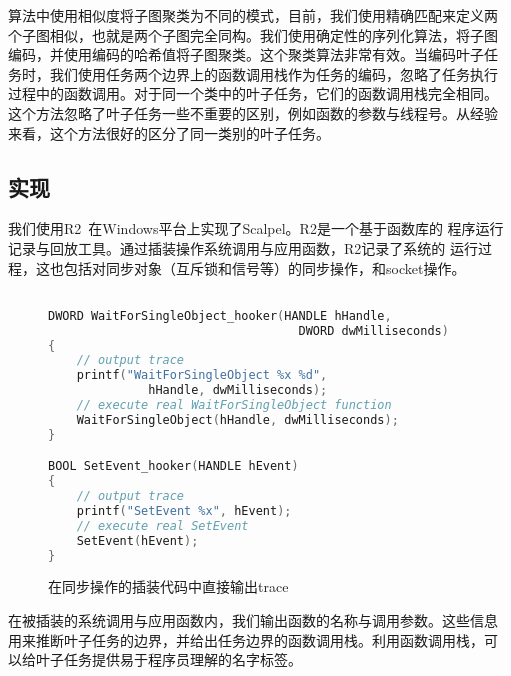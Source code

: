 算法中使用相似度将子图聚类为不同的模式，目前，我们使用精确匹配来定义两
个子图相似，也就是两个子图完全同构。我们使用确定性的序列化算法，将子图
编码，并使用编码的哈希值将子图聚类。这个聚类算法非常有效。当编码叶子任
务时，我们使用任务两个边界上的函数调用栈作为任务的编码，忽略了任务执行
过程中的函数调用。对于同一个类中的叶子任务，它们的函数调用栈完全相同。
这个方法忽略了叶子任务一些不重要的区别，例如函数的参数与线程号。从经验
来看，这个方法很好的区分了同一类别的叶子任务。



\subsection{实现}

我们使用R2~\cite{r2}在Windows平台上实现了Scalpel。R2是一个基于函数库的
程序运行记录与回放工具。通过插装操作系统调用与应用函数，R2记录了系统的
运行过程，这也包括对同步对象（互斥锁和信号等）的同步操作，和socket操作。

\begin{figure}
\centering
\begin{lstlisting}[language=C++]

DWORD WaitForSingleObject_hooker(HANDLE hHandle,
                                   DWORD dwMilliseconds)
{
    // output trace
    printf("WaitForSingleObject %x %d",
              hHandle, dwMilliseconds);
    // execute real WaitForSingleObject function
    WaitForSingleObject(hHandle, dwMilliseconds);
}

BOOL SetEvent_hooker(HANDLE hEvent)
{
    // output trace
    printf("SetEvent %x", hEvent);
    // execute real SetEvent
    SetEvent(hEvent);
}
\end{lstlisting}
\caption{在同步操作的插装代码中直接输出trace}
\label{fig:trace_direct}
\end{figure}

在被插装的系统调用与应用函数内，我们输出函数的名称与调用参数。这些信息
用来推断叶子任务的边界，并给出任务边界的函数调用栈。利用函数调用栈，可
以给叶子任务提供易于程序员理解的名字标签。


